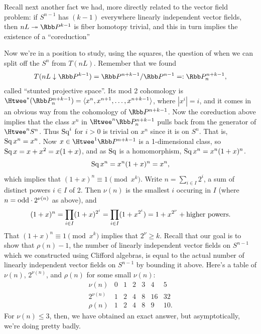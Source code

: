 Recall next another fact we had, more directly related to the vector field problem: if $S^{n-1}$ has $(k-1)$ everywhere linearly independent vector fields, then $nL \onto \RP^{k-1}$ is fiber homotopy trivial, and this in turn implies the existence of a ``coreduction''
Now we're in a position to study, using the squares, the question of when we can split off the $S^n$ from $T(nL)$.  Remember that we found
\[
T(nL\downarrow\RP^{k-1}) = \RP^{n+k-1}/\RP^{n-1} =: \RP^{n+k-1}_n
,\]
called ``stunted projective space''.  Its mod 2 cohomology is $\Htwee^*(\RP^{n+k-1}_n) = \langle x^n, x^{n+1}, \ldots, x^{n+k-1} \rangle$, where $|x^i| = i$, and it comes in an obvious way from the cohomology of $\RP^{n+k-1}$.  Now the coreduction above implies that the class $x^n$ in $\Htwee^n \RP^{n+k-1}_n$ pulls back from the generator of $\Htwee^n S^n$.  Thus $\operatorname{Sq}^i$ for $i > 0$ is trivial on $x^n$ since it is on $S^n$. That is, $\operatorname{Sq} x^n=x^n$.  Now $x \in \Htwee^1 \RP^{n+k-1}$ is a 1-dimensional class, so $\operatorname{Sq} x = x + x^2 = x(1+x)$, and as $\operatorname{Sq}$ is a homomorphism, $\operatorname{Sq} x^n = x^n(1+x)^n$. %
\[
\operatorname{Sq} x^n = x^n(1 + x)^n = x^n
,\]
which implies that $(1+x)^n \equiv 1 \pmod{x^k}$.  Write $n = \sum_{i \in I} 2^i$, a sum of distinct powers $i \in I$ of 2.  Then $\nu(n)$ is the smallest $i$ occuring in $I$ (where $n=\textup{odd}\cdot2^{\nu(n)}$ as above), and
\[
(1+x)^n = \prod_{i \in I} (1 + x)^{2^i} = \prod_{i \in I} (1 + x^{2^i}) = 1 + x^{2^\nu} + \hbox{higher powers}
.\]
That $(1 + x)^n \equiv 1 \pmod{x^k}$ implies that $2^\nu \ge k$.  Recall that our goal is to show that $\rho(n) - 1$, the number of linearly independent vector fields on $S^{n-1}$ which we constructed using Clifford algebras, is equal to the actual number of linearly independent vector fields on $S^{n-1}$ by bounding it above.  Here's a table of $\nu(n)$, $2^{\nu(n)}$, and $\rho(n)$ for some small $\nu(n)$:
\[
\begin{array}{c|cccccc}
\nu(n) & 0 & 1 & 2 & 3 & 4 & 5 \\
\hline
2^{\nu(n)} & 1 & 2 & 4 & 8 & 16 & 32 \\
\rho(n) & 1 & 2 & 4 & 8 & 9 & 10.
\end{array}
\]
For $\nu(n) \le 3$, then, we have obtained an exact answer, but asymptotically, we're doing pretty badly.

